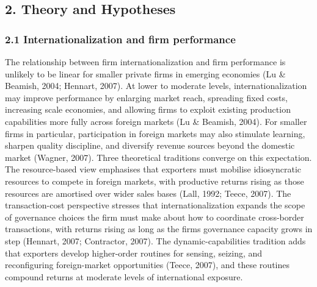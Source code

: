 \documentclass[12pt,a4paper]{article}
\begin{document}
\hypertarget{2-theory-and-hypotheses}{%
\subsection{2. Theory and Hypotheses}\label{2-theory-and-hypotheses}}

\hypertarget{21-internationalization-and-firm-performance}{%
\subsubsection{2.1 Internationalization and firm
performance}\label{21-internationalization-and-firm-performance}}

The relationship between firm internationalization and firm performance
is unlikely to be linear for smaller private firms in emerging economies
(Lu \& Beamish, 2004; Hennart, 2007). At lower to moderate levels,
internationalization may improve performance by enlarging market reach,
spreading fixed costs, increasing scale economies, and allowing firms to
exploit existing production capabilities more fully across foreign
markets (Lu \& Beamish, 2004). For smaller firms in particular,
participation in foreign markets may also stimulate learning, sharpen
quality discipline, and diversify revenue sources beyond the domestic
market (Wagner, 2007). Three theoretical traditions converge on this
expectation. The resource-based view emphasises that exporters must
mobilise idiosyncratic resources to compete in foreign markets, with
productive returns rising as those resources are amortised over wider
sales bases (Lall, 1992; Teece, 2007). The transaction-cost perspective
stresses that internationalization expands the scope of governance
choices the firm must make about how to coordinate cross-border
transactions, with returns rising as long as the firm\textquotesingle s
governance capacity grows in step (Hennart, 2007; Contractor, 2007). The
dynamic-capabilities tradition adds that exporters develop higher-order
routines for sensing, seizing, and reconfiguring foreign-market
opportunities (Teece, 2007), and these routines compound returns at
moderate levels of international exposure.
\end{document}
